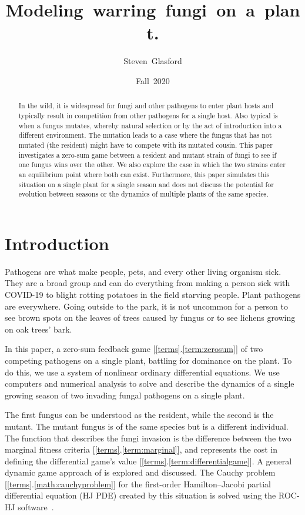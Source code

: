 \documentclass[11pt]{amsart}
\author{Steven~Glasford}
\title{Modeling~warring~fungi~on~a~plant.}
\begin{document}
\date{Fall~2020}

\maketitle

\begin{abstract}
    In the wild, it is widespread for fungi and other pathogens to enter plant hosts and typically result in competition from other pathogens for a single host. Also typical is when a fungus mutates, whereby natural selection or by the act of introduction into a different environment. The mutation leads to a case where the fungus that has not mutated (the resident) might have to compete with its mutated cousin.
    This paper investigates a zero-sum game between a resident and mutant strain of fungi to see if one fungus wins over the other. We also explore the case in which the two strains enter an equilibrium point where both can exist. Furthermore, this paper simulates this situation on a single plant for a single season and does not discuss the potential for evolution between seasons or the dynamics of multiple plants of the same species.
\end{abstract}


\section{Introduction}
Pathogens are what make people, pets, and every other living organism sick. They are a broad group and can do everything from making a person sick with COVID-19 to blight rotting potatoes in the field starving people. Plant pathogens are everywhere. Going outside to the park, it is not uncommon for a person to see brown spots on the leaves of trees caused by fungus or to see lichens growing on oak trees' bark. 

In this paper, a zero-sum feedback game [\ref{terms}.\ref{term:zerosum}] of two competing pathogens on a single plant, battling for dominance on the plant. To do this, we use a system of nonlinear ordinary differential equations. We use computers and numerical analysis to solve and describe the dynamics of a single growing season of two invading fungal pathogens on a single plant. 

The first fungus can be understood as the resident, while the second is the mutant. The mutant fungus is of the same species but is a different individual.  The function that describes the fungi invasion is the difference between the two marginal fitness criteria [\ref{terms}.\ref{term:marginal}], and represents the cost in defining the  differential game's value [\ref{terms}.\ref{term:differentialgame}].  A general dynamic game approach of \cite{YegorovGrognardMailleretHalkettBernhard2019} is explored and discussed. The Cauchy problem [\ref{terms}.\ref{math:cauchyproblem}] for the first-order Hamilton--Jacobi partial differential equation (HJ PDE) created by this situation is solved using the ROC-HJ software~\cite{ROCHJ2019}. 
\end{document}
